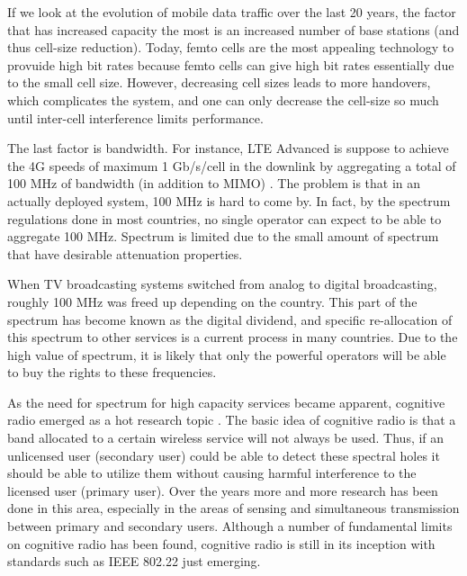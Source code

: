 \documentclass[journal,11pt,draftclsnofoot,onecolumn]{IEEEtran}
\begin{document}
If we look at the evolution of mobile data traffic over the last 20 years, the factor that has increased capacity the most is an increased number of base stations (and thus cell-size reduction).
Today, femto cells are the most appealing technology to provuide high bit rates because femto cells can give high bit rates essentially due to the small cell size. However, decreasing cell sizes leads to more handovers, which complicates the system, and one can only decrease the cell-size so much until inter-cell interference limits performance.


The last factor is bandwidth. For instance, LTE Advanced is suppose to achieve the 4G speeds of maximum 1 Gb/s/cell in the downlink by aggregating a total of 100 MHz of bandwidth (in addition to  MIMO) \cite{3gpp1}. The problem is that in an actually deployed system, 100 MHz is hard to come by. In fact, by the spectrum regulations done in most countries, no single operator can expect to be able to aggregate 100 MHz. Spectrum is limited due to the small amount of spectrum that have desirable attenuation properties. 

When TV broadcasting systems switched from analog to digital broadcasting, roughly 100 MHz was freed up depending on the country. This part of the spectrum has become known as the digital dividend, and specific re-allocation of this spectrum to other services is a current process in many countries. Due to the high value of spectrum, it is likely that only the powerful operators will be able to buy the rights to these frequencies.

As the need for spectrum for high capacity services became apparent, cognitive radio emerged as a hot research topic \cite{mitola}. The basic idea of cognitive radio is that a band allocated to a certain wireless service will not always be used. Thus, if an unlicensed user (secondary user) could be able to detect these spectral holes it should be able to utilize them without causing harmful interference to the licensed user (primary user). Over the years more and more research has been done in this area, especially in the areas of sensing and simultaneous transmission between primary and secondary users. Although a number of fundamental limits on cognitive radio has been found, cognitive radio is still in its inception with standards such as IEEE 802.22 \cite{wran} just emerging.
\end{document}
